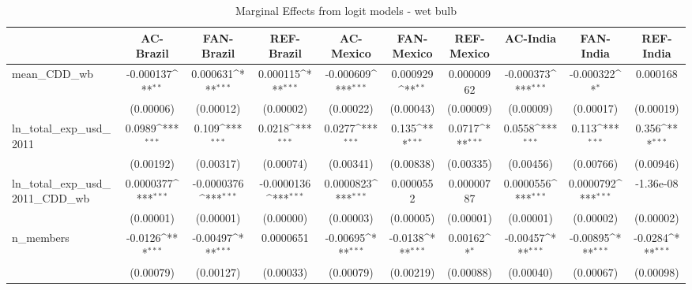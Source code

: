 \begin{table}[htbp]\centering
\def\sym#1{\ifmmode^{#1}\else\(^{#1}\)\fi}
\caption{Marginal Effects from logit models - wet bulb}
\begin{tabular}{l*{9}{c}}
\hline\hline
            &\multicolumn{1}{c}{AC-Brazil}&\multicolumn{1}{c}{FAN-Brazil}&\multicolumn{1}{c}{REF-Brazil}&\multicolumn{1}{c}{AC-Mexico}&\multicolumn{1}{c}{FAN-Mexico}&\multicolumn{1}{c}{REF-Mexico}&\multicolumn{1}{c}{AC-India}&\multicolumn{1}{c}{FAN-India}&\multicolumn{1}{c}{REF-India}\\
\hline
mean\_CDD\_wb &   -0.000137\sym{**} &    0.000631\sym{***}&    0.000115\sym{***}&   -0.000609\sym{***}&    0.000929\sym{**} &  0.00000962         &   -0.000373\sym{***}&   -0.000322\sym{*}  &    0.000168         \\
            &   (0.00006)         &   (0.00012)         &   (0.00002)         &   (0.00022)         &   (0.00043)         &   (0.00009)         &   (0.00009)         &   (0.00017)         &   (0.00019)         \\
ln\_total\_exp\_usd\_2011&      0.0989\sym{***}&       0.109\sym{***}&      0.0218\sym{***}&      0.0277\sym{***}&       0.135\sym{***}&      0.0717\sym{***}&      0.0558\sym{***}&       0.113\sym{***}&       0.356\sym{***}\\
            &   (0.00192)         &   (0.00317)         &   (0.00074)         &   (0.00341)         &   (0.00838)         &   (0.00335)         &   (0.00456)         &   (0.00766)         &   (0.00946)         \\
ln\_total\_exp\_usd\_2011\_CDD\_wb&   0.0000377\sym{***}&  -0.0000376\sym{***}&  -0.0000136\sym{***}&   0.0000823\sym{***}&   0.0000552         &  0.00000787         &   0.0000556\sym{***}&   0.0000792\sym{***}&   -1.36e-08         \\
            &   (0.00001)         &   (0.00001)         &   (0.00000)         &   (0.00003)         &   (0.00005)         &   (0.00001)         &   (0.00001)         &   (0.00002)         &   (0.00002)         \\
n\_members   &     -0.0126\sym{***}&    -0.00497\sym{***}&   0.0000651         &    -0.00695\sym{***}&     -0.0138\sym{***}&     0.00162\sym{*}  &    -0.00457\sym{***}&    -0.00895\sym{***}&     -0.0284\sym{***}\\
            &   (0.00079)         &   (0.00127)         &   (0.00033)         &   (0.00079)         &   (0.00219)         &   (0.00088)         &   (0.00040)         &   (0.00067)         &   (0.00098)         \\

\end{tabular}
\end{table}
